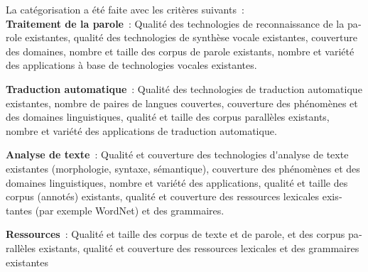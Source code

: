 \begin{french}
\begin{multicols}{2}
La catégorisation a été faite avec les critères suivants~:\\

{\bf Traitement de la parole}~: Qualité des technologies de
reconnaissance de la parole existantes, qualité des technologies de
synthèse vocale existantes, couverture des domaines, nombre et taille
des corpus de parole existants, nombre et variété des applications à
base de technologies vocales existantes.

{\bf Traduction automatique}~: Qualité des technologies de traduction
automatique existantes, nombre de paires de langues couvertes,
couverture des phénomènes et des domaines linguistiques, qualité et
taille des corpus parallèles existants, nombre et variété des
applications de traduction automatique.

{\bf Analyse de texte}~: Qualité et couverture des technologies
d{\mbox '}analyse de texte existantes (morphologie, syntaxe, sémantique),
couverture des phénomènes et des domaines linguistiques, nombre et
variété des applications, qualité et taille des corpus (annotés)
existants, qualité et couverture des ressources lexicales existantes
(par exemple WordNet) et des grammaires.

{\bf Ressources}~: Qualité et taille des corpus de texte et de parole,
et des corpus parallèles existants, qualité et couverture des
ressources lexicales et des grammaires existantes


\end{multicols}
\end{french}
